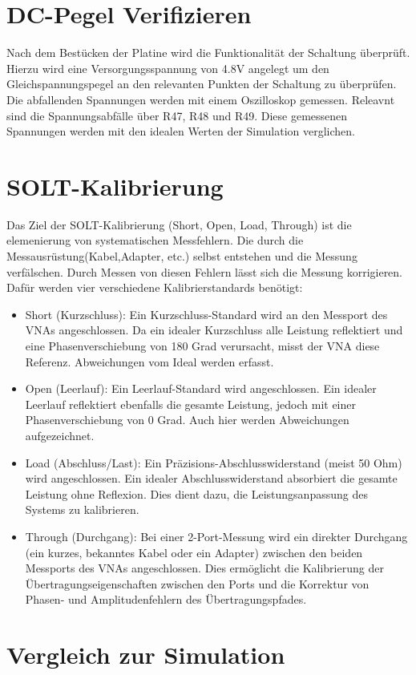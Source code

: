 \section{DC-Pegel Verifizieren}
Nach dem Bestücken der Platine wird die Funktionalität der Schaltung überprüft. Hierzu wird eine Versorgungsspannung von 
4.8V angelegt um den Gleichspannungspegel an den relevanten Punkten der Schaltung zu überprüfen. Die abfallenden 
Spannungen werden mit einem Oszilloskop gemessen. Releavnt sind die Spannungsabfälle über R47, R48 und R49. Diese gemessenen
Spannungen werden mit den idealen Werten 
der Simulation verglichen. 

\section{SOLT-Kalibrierung}
Das Ziel der SOLT-Kalibrierung (Short, Open, Load, Through) ist die elemenierung
von systematischen Messfehlern. Die durch die Messausrüstung(Kabel,Adapter, etc.)
selbst entstehen und die Messung verfälschen.
Durch Messen von diesen Fehlern lässt sich die Messung korrigieren.
Dafür werden vier verschiedene Kalibrierstandards benötigt:
\begin{itemize}
    \item Short (Kurzschluss): Ein Kurzschluss-Standard wird an den Messport des VNAs angeschlossen. Da ein idealer Kurzschluss alle Leistung reflektiert und eine Phasenverschiebung von 180 Grad verursacht, misst der VNA diese Referenz. Abweichungen vom Ideal werden erfasst. 
    \item Open (Leerlauf): Ein Leerlauf-Standard wird angeschlossen. Ein idealer Leerlauf reflektiert ebenfalls die gesamte Leistung, jedoch mit einer Phasenverschiebung von 0 Grad. Auch hier werden Abweichungen aufgezeichnet.
    \item Load (Abschluss/Last): Ein Präzisions-Abschlusswiderstand (meist 50 Ohm) wird angeschlossen. Ein idealer Abschlusswiderstand absorbiert die gesamte Leistung ohne Reflexion. Dies dient dazu, die Leistungsanpassung des Systems zu kalibrieren.
    \item Through (Durchgang): Bei einer 2-Port-Messung wird ein direkter Durchgang (ein kurzes, bekanntes Kabel oder ein Adapter) zwischen den beiden Messports des VNAs angeschlossen. Dies ermöglicht die Kalibrierung der Übertragungseigenschaften zwischen den Ports und die Korrektur von Phasen- und Amplitudenfehlern des Übertragungspfades.
\end{itemize}
\section{Vergleich zur Simulation}
\clearpage
